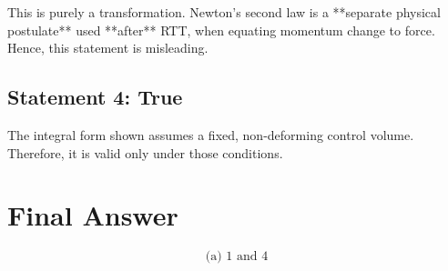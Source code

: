 \documentclass[12pt]{article}
\begin{document}
This is purely a transformation. Newton's second law is a **separate physical postulate** used **after** RTT, when equating momentum change to force. Hence, this statement is misleading.

\subsection*{Statement 4: True}

The integral form shown assumes a fixed, non-deforming control volume. Therefore, it is valid only under those conditions.

\section*{Final Answer}

\[
\boxed{\text{(a) 1 and 4}}
\]
\end{document}
